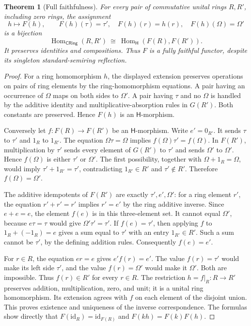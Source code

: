 \documentclass[11pt]{article}
\newtheorem{theorem}{Theorem}[section]
\theoremstyle{definition}
\newcommand{\HH}{\mathsf H}
\newcommand{\CR}{\mathsf{CRing}}
\newcommand{\Om}{\Omega}
\begin{document}
\begin{theorem}[Full faithfulness]\label{thm:fullyfaithful}
For every pair of commutative unital rings \(R,R'\), including zero rings,
the assignment
\[
 h\longmapsto F(h),\qquad
 F(h)(\tau)=\tau',\quad F(h)(r)=h(r),\quad F(h)(\Om)=\Om'
\tag{8}\label{eq:Ffunctor}
\]
is a bijection
\[
 \operatorname{Hom}_{\CR}(R,R')
 \ \cong\ \operatorname{Hom}_{\HH}(F(R),F(R')).
\tag{9}\label{eq:fullyfaithful}
\]
It preserves identities and compositions. Thus \(F\) is a fully faithful
functor, despite its singleton standard-semiring reflection.
\end{theorem}
\begin{proof}
For a ring homomorphism \(h\), the displayed extension preserves operations
on pairs of ring elements by the ring-homomorphism equations. A pair
having an occurrence of \(\Om\) maps on both sides to \(\Om'\).
A pair having \(\tau\) and no \(\Om\) is handled by the additive
identity and multiplicative-absorption rules in \(G(R')\).
Both constants are preserved. Hence \(F(h)\) is an \(\HH\)-morphism.

Conversely let \(f:F(R)\to F(R')\) be an \(\HH\)-morphism. Write
\(e'=0_{R'}\). It sends \(\tau\) to \(\tau'\) and \(1_R\) to
\(1_{R'}\). The equation \(\Om\tau=\Om\) implies
\(f(\Om)\tau'=f(\Om)\). In \(F(R')\), multiplication by \(\tau'\)
sends every element of \(G(R')\) to \(\tau'\) and sends \(\Om'\)
to \(\Om'\). Hence \(f(\Om)\) is either \(\tau'\) or \(\Om'\).
The first possibility, together with \(\Om+1_R=\Om\), would imply
\(\tau'+1_{R'}=\tau'\), contradicting \(1_{R'}\in R'\) and
\(\tau'\notin R'\). Therefore \(f(\Om)=\Om'\).

The additive idempotents of \(F(R')\) are exactly
\(\tau',e',\Om'\): for a ring element \(r'\), the equation
\(r'+r'=r'\) implies \(r'=e'\) by the ring additive inverse.
Since \(e+e=e\), the element \(f(e)\) is in this three-element set.
It cannot equal \(\Om'\), because \(e\tau=\tau\) would give
\(\Om'\tau'=\tau'\). If \(f(e)=\tau'\), then applying \(f\)
to \(1_R+(-1_R)=e\) gives a sum equal to \(\tau'\) with an entry
\(1_{R'}\in R'\). Such a sum cannot be \(\tau'\), by the defining
addition rules. Consequently \(f(e)=e'\).

For \(r\in R\), the equation \(er=e\) gives \(e'f(r)=e'\).
The value \(f(r)=\tau'\) would make its left side \(\tau'\), and
the value \(f(r)=\Om'\) would make it \(\Om'\). Both are impossible.
Thus \(f(r)\in R'\) for every \(r\in R\). The restriction
\(h=f|_R:R\to R'\) preserves addition, multiplication, zero, and unit;
it is a unital ring homomorphism. Its extension agrees with \(f\) on
each element of the disjoint union. This proves existence and uniqueness
of the inverse correspondence. The formulas show directly that
\(F(\mathrm{id}_R)=\mathrm{id}_{F(R)}\) and
\(F(kh)=F(k)F(h)\).
\end{proof}
\end{document}
